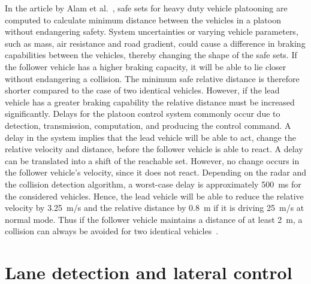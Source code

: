 In the article by Alam et al.~\cite{johansson2013}, safe sets for heavy duty vehicle platooning are computed to calculate minimum distance between the  vehicles in a platoon without endangering safety. System uncertainties or varying vehicle parameters, such as mass, air resistance and road gradient, could cause a difference in braking capabilities between the vehicles, thereby changing the shape of the safe sets. If the follower vehicle has a higher braking capacity, it will be able to lie closer without endangering a collision. The minimum safe relative distance is therefore shorter compared to the case of two identical vehicles. However, if the lead vehicle has a greater braking capability the relative distance must be increased significantly. Delays for the platoon control system commonly occur due to detection, transmission, computation, and producing the control command. A delay in the system implies that the lead vehicle will be able to act, change the relative velocity and distance, before the follower vehicle is able to react. A delay can be translated into a shift of the reachable set. However, no change occurs in the follower vehicle's velocity, since it does not react. Depending on the radar and the collision detection algorithm, a worst-case delay is approximately 500~ms for the considered vehicles. Hence, the lead vehicle will be able to reduce the relative velocity by 3.25~m/s and the relative distance by 0.8~m if it is driving 25~m/s at normal mode. Thus if the follower vehicle maintains a distance of at least 2~m, a collision can always be avoided for two identical vehicles~\cite{johansson2013}.

\section{Lane detection and lateral control}
%